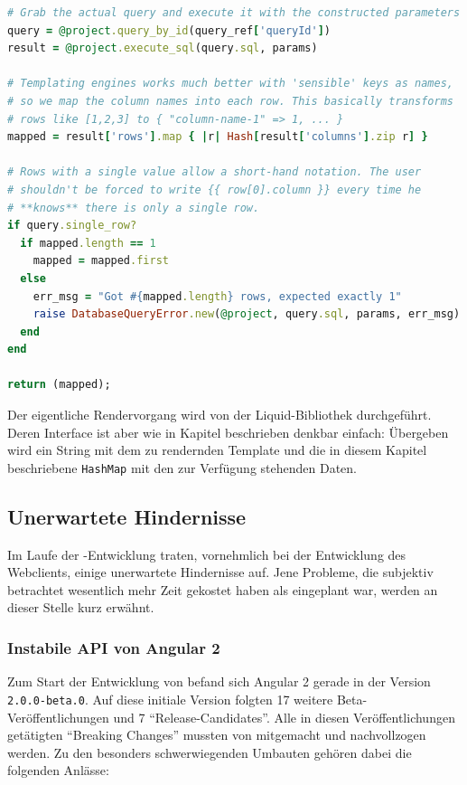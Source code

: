 \begin{lstlisting}[float=p, language=Ruby, caption={Renderdaten einer Abfrage (2): Ausführen und transformieren}, label={lst:server-project-query-map-results}]
# Grab the actual query and execute it with the constructed parameters
query = @project.query_by_id(query_ref['queryId'])
result = @project.execute_sql(query.sql, params)

# Templating engines works much better with 'sensible' keys as names,
# so we map the column names into each row. This basically transforms
# rows like [1,2,3] to { "column-name-1" => 1, ... }
mapped = result['rows'].map { |r| Hash[result['columns'].zip r] }

# Rows with a single value allow a short-hand notation. The user
# shouldn't be forced to write {{ row[0].column }} every time he
# **knows** there is only a single row.
if query.single_row?
  if mapped.length == 1
    mapped = mapped.first
  else
    err_msg = "Got #{mapped.length} rows, expected exactly 1"
    raise DatabaseQueryError.new(@project, query.sql, params, err_msg)
  end
end

return (mapped);
\end{lstlisting}

Der eigentliche Rendervorgang wird von der Liquid-Bibliothek durchgeführt. Deren Interface ist aber wie in Kapitel  beschrieben denkbar einfach: Übergeben wird ein String mit dem zu rendernden Template und die in diesem Kapitel beschriebene \texttt{HashMap} mit den zur Verfügung stehenden Daten.

\subsection{Unerwartete Hindernisse}
\label{sec:unexpected-problems}

Im Laufe der \idename{}-Entwicklung traten, vornehmlich bei der Entwicklung des Webclients, einige unerwartete Hindernisse auf. Jene Probleme, die subjektiv betrachtet wesentlich mehr Zeit gekostet haben als eingeplant war, werden an dieser Stelle kurz erwähnt.

\subsubsection{Instabile API von Angular 2}

Zum Start der Entwicklung von \idename{} befand sich Angular 2 gerade in der Version \texttt{2.0.0-beta.0}. Auf diese initiale Version folgten 17 weitere Beta-Veröffentlichungen und 7 "`Release-Candidates"'. Alle in diesen Veröffentlichungen getätigten "`Breaking Changes"' mussten von \idename{} mitgemacht und nachvollzogen werden. Zu den besonders schwerwiegenden Umbauten gehören dabei die folgenden Anlässe:

